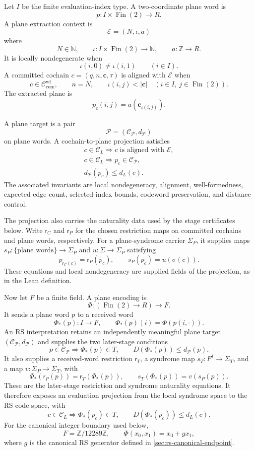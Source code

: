 Let \(I\) be the finite evaluation-index type. A two-coordinate plane word is
\[
  p:I\times\operatorname{Fin}(2)\to R.
\]
A plane extraction context is
\[
  \mathcal E=(N,\iota,a)
\]
where
\[
  N\in\mathbb N,\qquad
  \iota:I\times\operatorname{Fin}(2)\to\mathbb N,\qquad
  a:\mathbb Z\to R.
\]
It is locally nondegenerate when
\[
  \iota(i,0)\ne \iota(i,1)\qquad(i\in I).
\]
A committed cochain \(c=(q,n,\mathbf c,\tau)\) is aligned with
\(\mathcal E\) when
\[
  c\in\mathcal C_{\mathrm{com}}^{\mathrm{wf}},\qquad
  n=N,\qquad
  \iota(i,j)<|\mathbf c|\quad(i\in I,\ j\in\operatorname{Fin}(2)).
\]
The extracted plane is
\[
  p_c(i,j)=a(\mathbf c_{\iota(i,j)}).
\]

A plane target is a pair
\[
  \mathcal P=(\mathcal C_{\mathcal P},d_{\mathcal P})
\]
on plane words. A cochain-to-plane projection satisfies
\[
\begin{gathered}
  c\in\mathcal C_L\Longrightarrow c\text{ is aligned with }\mathcal E,\\
  c\in\mathcal C_L\Longrightarrow
    p_c\in\mathcal C_{\mathcal P},\\
  d_{\mathcal P}(p_c)\le d_L(c).
\end{gathered}
\]
The associated invariants are local nondegeneracy, alignment,
well-formedness, expected edge count, selected-index bounds, codeword
preservation, and distance control.

The projection also carries the naturality data used by the stage
certificates below. Write \(\mathsf r_C\) and \(\mathsf r_P\) for the
chosen restriction maps on committed cochains and plane words, respectively.
For a plane-syndrome carrier \(\Sigma_P\), it supplies maps
\(s_P:\{\text{plane words}\}\to\Sigma_P\) and
\(u:\Sigma\to\Sigma_P\) satisfying
\[
  p_{\mathsf r_C(c)}=\mathsf r_P(p_c),
  \qquad
  s_P(p_c)=u(\sigma(c)).
\]
These equations and local nondegeneracy are supplied fields of the
projection, as in the Lean definition.

Now let \(F\) be a finite field. A plane encoding is
\[
  \Phi:(\operatorname{Fin}(2)\to R)\to F.
\]
It sends a plane word \(p\) to a received word
\[
  \Phi_\ast(p):I\to F,\qquad
  \Phi_\ast(p)(i)=\Phi(p(i,\cdot)).
\]
An RS interpretation retains an independently meaningful plane target
\((\mathcal C_{\mathcal P},d_{\mathcal P})\) and supplies the two later-stage
conditions
\[
  p\in\mathcal C_{\mathcal P}
  \Longrightarrow
  \Phi_\ast(p)\in T,
  \qquad
  D(\Phi_\ast(p))\le d_{\mathcal P}(p).
\]
It also supplies a received-word restriction \(\mathsf r_T\), a syndrome
map \(s_T:F^I\to\Sigma_T\), and a map
\(v:\Sigma_P\to\Sigma_T\), with
\[
  \Phi_\ast(\mathsf r_P(p))=\mathsf r_T(\Phi_\ast(p)),
  \qquad
  s_T(\Phi_\ast(p))=v(s_P(p)).
\]
These are the later-stage restriction and syndrome naturality equations.
It therefore exposes an evaluation projection from the local syndrome space
to the RS code space, with
\[
  c\in\mathcal C_L
  \Longrightarrow
  \Phi_\ast(p_c)\in T,
  \qquad
  D(\Phi_\ast(p_c))\le d_L(c).
\]
For the canonical integer boundary used below,
\[
  F=\mathbb Z/12289\mathbb Z,\qquad
  \Phi(x_0,x_1)=x_0+g x_1,
\]
where \(g\) is the canonical RS generator defined in
\cref{sec:rs-canonical-endpoint}.

